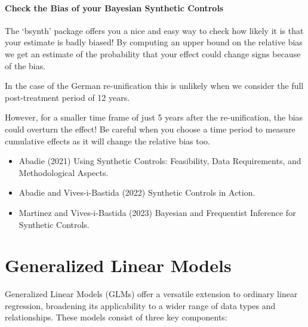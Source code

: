 \documentclass[
  letterpaper,
  DIV=11,
  numbers=noendperiod]{scrreprt}
\providecommand{\tightlist}{%
  \setlength{\itemsep}{0pt}\setlength{\parskip}{0pt}}\usepackage{longtable,booktabs,array}
\begin{document}
\subsection{Check the Bias of your Bayesian Synthetic
Controls}\label{check-the-bias-of-your-bayesian-synthetic-controls}

The `bsynth' package offers you a nice and easy way to check how likely
it is that your estimate is badly biased! By computing an upper bound on
the relative bias we get an estimate of the probability that your effect
could change signs because of the bias.

In the case of the German re-unification this is unlikely when we
consider the full post-treatment period of 12 years.

However, for a smaller time frame of just 5 years after the
re-unification, the bias could overturn the effect! Be careful when you
choose a time period to measure cumulative effects as it will change the
relative bias too.

\begin{tcolorbox}[enhanced jigsaw, colframe=quarto-callout-tip-color-frame, left=2mm, toprule=.15mm, colbacktitle=quarto-callout-tip-color!10!white, title=\textcolor{quarto-callout-tip-color}{\faLightbulb}\hspace{0.5em}{Learn more}, coltitle=black, rightrule=.15mm, leftrule=.75mm, colback=white, arc=.35mm, bottomtitle=1mm, bottomrule=.15mm, breakable, titlerule=0mm, opacitybacktitle=0.6, toptitle=1mm, opacityback=0]

\begin{itemize}
\tightlist
\item
  Abadie (2021) Using Synthetic Controls: Feasibility, Data
  Requirements, and Methodological Aspects.
\item
  Abadie and Vives-i-Bastida (2022) Synthetic Controls in Action.
\item
  Martinez and Vives-i-Bastida (2023) Bayesian and Frequentist Inference
  for Synthetic Controls.
\end{itemize}

\end{tcolorbox}

\part{Generalized Linear Models}

Generalized Linear Models (GLMs) offer a versatile extension to ordinary
linear regression, broadening its applicability to a wider range of data
types and relationships. These models consist of three key components:
\end{document}
